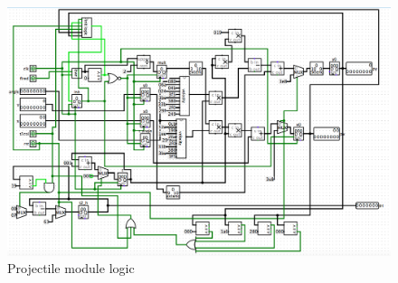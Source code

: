 \documentclass{article}
\begin{document}
\begin{figure}[H]
	\begin{center}
		\includegraphics[width=1\textwidth]{projectile.png} 
		\caption{Projectile module logic}
	\end{center}
\end{figure}
\end{document}
